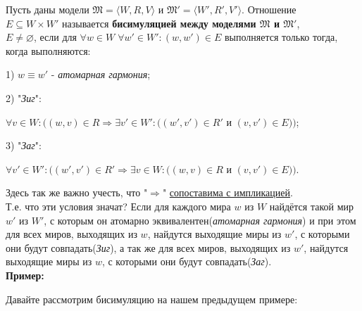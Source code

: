 \documentclass[18pt, a4paper]{extarticle}
\newcommand{\primer}{\textbf{Пример:\;}}
\newcommand{\mM}{\mathfrak{M}}
\begin{document}
Пусть даны модели $\mM=\langle W,R,V\rangle$ и $\mM'=\langle W',R',V'\rangle$. Отношение \\$E\subseteq W\times W'$ называется \textbf{бисимуляцией между моделями $\mM$ и $\mM'$},\\$E\neq\varnothing$, если для $\forall w\in W\;\forall w'\in W'\!\!:(w,w')\in E$ выполняется только тогда, когда выполняются:

1) $w\equiv w'$ - \textit{атомарная гармония};

2) "\textit{Зиг}":

\qquad$\forall v\in W\!\!:((w,v)\in R\Rightarrow\exists v'\in W'\!\!:((w',v')\in R'$ и $(v,v')\in E))$;

3) "\textit{Заг}":

\qquad$\forall v'\in W'\!\!:((w',v')\in R'\Rightarrow\exists v\in W\!\!:((w,v)\in R$ и $(v,v')\in E))$.

Здесь так же важно учесть, что "$\Rightarrow$"{} \underline{сопоставима с импликацией}.\\

Т.е. что эти условия значат? Если для каждого мира $w$ из $W$ найдётся такой мир $w'$ из $W'$, с которым он атомарно эквивалентен(\textit{атомарная гармония}) и при этом для всех миров, выходящих из $w$, найдутся выходящие миры из $w'$, с которыми они будут совпадать(\textit{Зиг}), а так же для всех миров, выходящих из $w'$, найдутся выходящие миры из $w$, с которыми они будут совпадать(\textit{Заг}).\\ 

\primer

Давайте рассмотрим бисимуляцию на нашем предыдущем примере:
\end{document}
